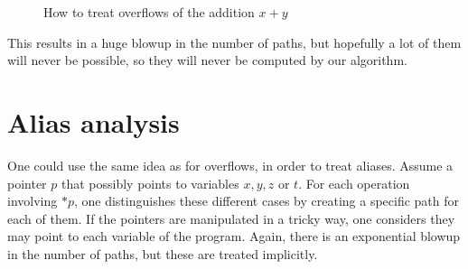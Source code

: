 \documentclass[a4paper,english,titlepage,11pt]{report}
\begin{document}
\begin{figure}[!h]
\centering
{}
\caption{How to treat overflows of the addition $x+y$}
\label{overflow}
\end{figure}

This results in a huge blowup in the number of paths, but hopefully a lot of
them will never be possible, so they will never be computed by our algorithm.

	\section{Alias analysis}

One could use the same idea as for overflows, in order to treat aliases.
Assume a pointer $p$ that possibly points to variables $x,y,z$ or $t$. For each
operation involving $*p$, one distinguishes these different cases by
creating a specific path for each of them. 
If the pointers are manipulated in a tricky way, one considers they may
point to each variable of the program. Again, there is an exponential blowup in
the number of paths, but these are treated implicitly.
\end{document}
